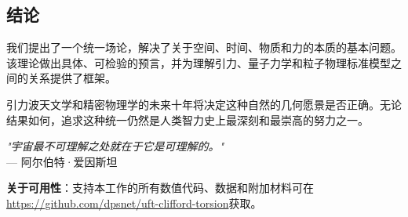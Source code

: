 \subsection{结论}

我们提出了一个统一场论，解决了关于空间、时间、物质和力的本质的基本问题。该理论做出具体、可检验的预言，并为理解引力、量子力学和粒子物理标准模型之间的关系提供了框架。

引力波天文学和精密物理学的未来十年将决定这种自然的几何愿景是否正确。无论结果如何，追求这种统一仍然是人类智力史上最深刻和最崇高的努力之一。

\begin{center}
\textit{"宇宙最不可理解之处就在于它是可理解的。"}\\
--- 阿尔伯特·爱因斯坦
\end{center}

\vspace{1cm}

\noindent\textbf{关于可用性}：支持本工作的所有数值代码、数据和附加材料可在\url{https://github.com/dpsnet/uft-clifford-torsion}获取。
